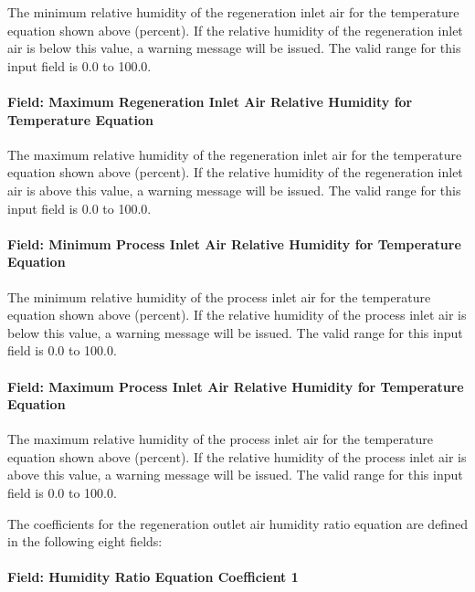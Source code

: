 The minimum relative humidity of the regeneration inlet air for the temperature equation shown above (percent). If the relative humidity of the regeneration inlet air is below this value, a warning message will be issued. The valid range for this input field is 0.0 to 100.0.

\paragraph{Field: Maximum Regeneration Inlet Air Relative Humidity for Temperature Equation}\label{field-maximum-regeneration-inlet-air-relative-humidity-for-temperature-equation}

The maximum relative humidity of the regeneration inlet air for the temperature equation shown above (percent). If the relative humidity of the regeneration inlet air is above this value, a warning message will be issued. The valid range for this input field is 0.0 to 100.0.

\paragraph{Field: Minimum Process Inlet Air Relative Humidity for Temperature Equation}\label{field-minimum-process-inlet-air-relative-humidity-for-temperature-equation}

The minimum relative humidity of the process inlet air for the temperature equation shown above (percent). If the relative humidity of the process inlet air is below this value, a warning message will be issued. The valid range for this input field is 0.0 to 100.0.

\paragraph{Field: Maximum Process Inlet Air Relative Humidity for Temperature Equation}\label{field-maximum-process-inlet-air-relative-humidity-for-temperature-equation}

The maximum relative humidity of the process inlet air for the temperature equation shown above (percent). If the relative humidity of the process inlet air is above this value, a warning message will be issued. The valid range for this input field is 0.0 to 100.0.

The coefficients for the regeneration outlet air humidity ratio equation are defined in the following eight fields:

\paragraph{Field: Humidity Ratio Equation Coefficient 1}\label{field-humidity-ratio-equation-coefficient-1}

